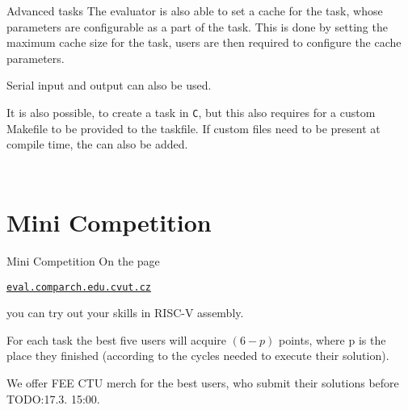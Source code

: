 \documentclass{beamer}
\begin{document}
		\begin{frame}[fragile]
			\tiny
			\inputminted{python}{examples/5/evaluate.py}
		\end{frame}

		\begin{frame}[fragile]
			\tiny
			\inputminted{toml}{examples/5/task.toml}
		\end{frame}

		\begin{frame}{Advanced tasks}
			The evaluator is also able to set a cache for the task, whose parameters are configurable as a part of the task. This is done by setting the maximum cache size for the task, users are then required to configure the cache parameters. \par

			Serial input and output can also be used. \par

			It is also possible, to create a task in \texttt{C}, but this also requires for a custom Makefile to be provided to the taskfile. If custom files need to be present at compile time, the can also be added. \par
		\end{frame}

		\begin{frame}[fragile]
			\small
			\inputminted{toml}{examples/5/cache.toml}
		\end{frame}

		\begin{frame}[fragile]
			\tiny
			\inputminted{toml}{examples/5/complex.toml}
		\end{frame}

	\section{Mini Competition}

	\begin{frame}{Mini Competition}
		On the page \par
		{\centering \texttt{\href{http://eval.comparch.edu.cvut.cz}{eval.comparch.edu.cvut.cz}} \par}
		you can try out your skills in RISC-V assembly. \par

		For each task the best five users will acquire $(6 - p)$ points, where p is the place they finished (according to the cycles needed to execute their solution). \par

		We offer FEE CTU merch for the best users, who submit their solutions before TODO:17.3. 15:00. \par
	\end{frame}
\end{document}
